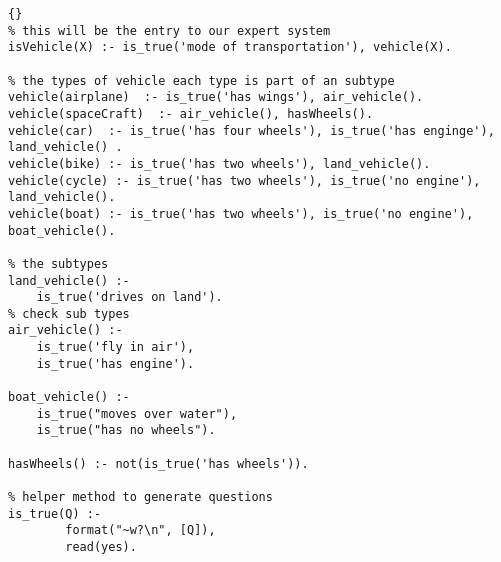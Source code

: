 \begin{lstlisting}{}
% this will be the entry to our expert system
isVehicle(X) :- is_true('mode of transportation'), vehicle(X).

% the types of vehicle each type is part of an subtype
vehicle(airplane)  :- is_true('has wings'), air_vehicle().
vehicle(spaceCraft)  :- air_vehicle(), hasWheels().
vehicle(car)  :- is_true('has four wheels'), is_true('has enginge'), land_vehicle() .
vehicle(bike) :- is_true('has two wheels'), land_vehicle().
vehicle(cycle) :- is_true('has two wheels'), is_true('no engine'), land_vehicle().
vehicle(boat) :- is_true('has two wheels'), is_true('no engine'), boat_vehicle().

% the subtypes 
land_vehicle() :-
	is_true('drives on land').
% check sub types
air_vehicle() :-
	is_true('fly in air'), 
	is_true('has engine').

boat_vehicle() :-
	is_true("moves over water"),
    is_true("has no wheels").

hasWheels() :- not(is_true('has wheels')).

% helper method to generate questions
is_true(Q) :-
        format("~w?\n", [Q]),
        read(yes).
\end{lstlisting}



